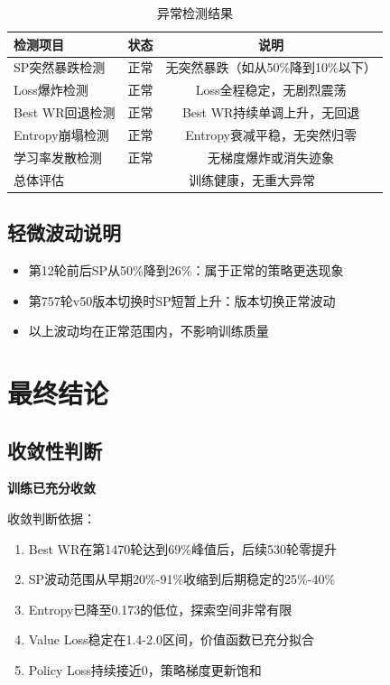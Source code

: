 \documentclass[12pt,a4paper]{article}
\begin{document}
\begin{table}[H]
\centering
\caption{异常检测结果}
\begin{tabular}{lcc}
\toprule
\textbf{检测项目} & \textbf{状态} & \textbf{说明} \\
\midrule
SP突然暴跌检测 & \textcolor{success}{正常} & 无突然暴跌（如从50\%降到10\%以下） \\
Loss爆炸检测 & \textcolor{success}{正常} & Loss全程稳定，无剧烈震荡 \\
Best WR回退检测 & \textcolor{success}{正常} & Best WR持续单调上升，无回退 \\
Entropy崩塌检测 & \textcolor{success}{正常} & Entropy衰减平稳，无突然归零 \\
学习率发散检测 & \textcolor{success}{正常} & 无梯度爆炸或消失迹象 \\
\midrule
总体评估 & \multicolumn{2}{c}{\textcolor{success}{训练健康，无重大异常}} \\
\bottomrule
\end{tabular}
\end{table}

\subsection{轻微波动说明}
\begin{itemize}
\item 第12轮前后SP从50\%降到26\%：属于正常的策略更迭现象
\item 第757轮v50版本切换时SP短暂上升：版本切换正常波动
\item 以上波动均在正常范围内，不影响训练质量
\end{itemize}

\newpage

\section{最终结论}

\subsection{收敛性判断}

\textcolor{success}{\Huge \textbf{训练已充分收敛}}

\vspace{0.5cm}

收敛判断依据：
\begin{enumerate}
\item Best WR在第1470轮达到69\%峰值后，后续530轮零提升
\item SP波动范围从早期20\%-91\%收缩到后期稳定的25\%-40\%
\item Entropy已降至0.173的低位，探索空间非常有限
\item Value Loss稳定在1.4-2.0区间，价值函数已充分拟合
\item Policy Loss持续接近0，策略梯度更新饱和
\end{enumerate}
\end{document}
